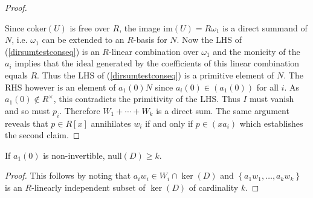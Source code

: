\begin{proof}
\begin{center}
\end{center}        
Since $  \mathrm{coker}(U) $ is free over $ R $, the image $ \mathrm{im}(U) = R \omega_{1}    $ is a direct summand of $ N $, i.e. $ \omega_{1} $ can be extended to an $R$-basis for $ N $. Now the LHS of (\ref{dirsumtestconseq}) is an $ R$-linear combination over $  \omega_{1} $ and the monicity of the $ a_{i} $ implies that the ideal generated by the coefficients of this linear combination equals $ R $. 
Thus the LHS of  (\ref{dirsumtestconseq}) is  a primitive element of $ N $.
The RHS however is an element of $ a_1(0) N $ since $ a_{i}(0) \in ( a_{1}(0)) $ for all $ i $. As  $ a_{1}(0)   \notin R^{\times} $, this contradicts the primitivity of the LHS.  Thus $ I $ must vanish and so must    $ p_{i} $.  Therefore $ W_{1}  + \cdots  +  W_{k }    $ is a direct sum. The same argument reveals that $ p \in R[x] $ annihilates $ w_{i}  $ if and only if $ p   \in (x a_{i} )$ which establishes the second claim. 
\end{proof}   


\begin{corollary} \label{nullityofD}     If $ a_{1}(0) $ is non-invertible, $ \mathrm{null}(D) \geq k   $.    
\end{corollary}  
\begin{proof} This follows by noting that  $  a_{i}w_{i} \in W_{i} \cap \ker(D) $ and  $  \left \{ a_{1}w_{1} , \ldots, a_{k} w_{k} \right \} $ is an $R$-linearly independent subset of $ \ker (D) $ of  cardinality $ k  $. 
\end{proof}  

